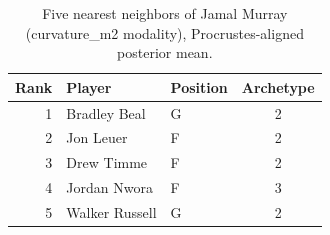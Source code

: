 \begin{table}[htbp]
  \centering\small
  \begin{tabular}{rllc}
    \toprule
    Rank & Player & Position & Archetype \\
    \midrule
    1 & Bradley Beal & G & 2 \\
    2 & Jon Leuer & F & 2 \\
    3 & Drew Timme & F & 2 \\
    4 & Jordan Nwora & F & 3 \\
    5 & Walker Russell & G & 2 \\
    \bottomrule
  \end{tabular}
  \caption{Five nearest neighbors of Jamal Murray (curvature_m2 modality), Procrustes-aligned posterior mean.}
  \label{tab:Jamal_Murray_neighbors_curvature_m2}
\end{table}

